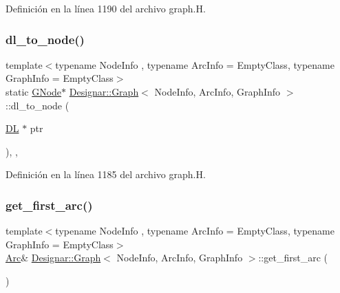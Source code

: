 Definición en la línea 1190 del archivo graph.\+H.

\mbox{\label{class_designar_1_1_graph_ab6f1de18d2ec0c537fc1daa5b4a42e01}} 
\subsubsection{\texorpdfstring{dl\+\_\+to\+\_\+node()}{dl\_to\_node()}}
{\footnotesize\ttfamily template$<$typename Node\+Info , typename Arc\+Info  = Empty\+Class, typename Graph\+Info  = Empty\+Class$>$ \\
static \hyperlink{class_designar_1_1_graph_a7e61951db0bb9bfa8a2e317440d4e17f}{G\+Node}$\ast$ \hyperlink{class_designar_1_1_graph}{Designar\+::\+Graph}$<$ Node\+Info, Arc\+Info, Graph\+Info $>$\+::dl\+\_\+to\+\_\+node (\begin{DoxyParamCaption}\item[{\hyperlink{class_designar_1_1_d_l}{DL} $\ast$}]{ptr }\end{DoxyParamCaption})\hspace{0.3cm}{\ttfamily [inline]}, {\ttfamily [static]}, {\ttfamily [protected]}}



Definición en la línea 1185 del archivo graph.\+H.

\mbox{\label{class_designar_1_1_graph_a6829f963f0db1fffbc535557f39ed877}} 
\subsubsection{\texorpdfstring{get\+\_\+first\+\_\+arc()}{get\_first\_arc()}\hspace{0.1cm}{\footnotesize\ttfamily [1/2]}}
{\footnotesize\ttfamily template$<$typename Node\+Info , typename Arc\+Info  = Empty\+Class, typename Graph\+Info  = Empty\+Class$>$ \\
\hyperlink{class_designar_1_1_graph_a74c730ef4ce2d20f998d72bd25c2b5bf}{Arc}\& \hyperlink{class_designar_1_1_graph}{Designar\+::\+Graph}$<$ Node\+Info, Arc\+Info, Graph\+Info $>$\+::get\+\_\+first\+\_\+arc (\begin{DoxyParamCaption}{ }\end{DoxyParamCaption})\hspace{0.3cm}{\ttfamily [inline]}}



